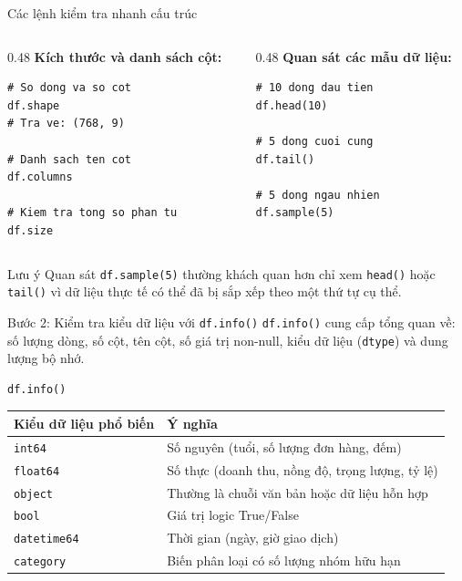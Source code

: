 \documentclass[aspectratio=169,11pt]{beamer}
\newcommand{\code}[1]{\texttt{#1}}
\newcommand{\smallgap}{\vspace{0.35em}}
\begin{document}
\begin{frame}[fragile]{Các lệnh kiểm tra nhanh cấu trúc}
\begin{columns}[T]
\begin{column}{0.48\textwidth}
\textbf{Kích thước và danh sách cột:}
\begin{lstlisting}[style=pythonstyle]
# So dong va so cot
df.shape
# Tra ve: (768, 9)

# Danh sach ten cot
df.columns

# Kiem tra tong so phan tu
df.size
\end{lstlisting}
\end{column}
\begin{column}{0.48\textwidth}
\textbf{Quan sát các mẫu dữ liệu:}
\begin{lstlisting}[style=pythonstyle]
# 10 dong dau tien
df.head(10)

# 5 dong cuoi cung
df.tail()

# 5 dong ngau nhien
df.sample(5)
\end{lstlisting}
\end{column}
\end{columns}

\smallgap
\begin{block}{Lưu ý}
Quan sát \code{df.sample(5)} thường khách quan hơn chỉ xem \code{head()} hoặc \code{tail()} vì dữ liệu thực tế có thể đã bị sắp xếp theo một thứ tự cụ thể.
\end{block}
\end{frame}

\begin{frame}[fragile]{Bước 2: Kiểm tra kiểu dữ liệu với \texttt{df.info()}}
\code{df.info()} cung cấp tổng quan về: số lượng dòng, số cột, tên cột, số giá trị non-null, kiểu dữ liệu (\code{dtype}) và dung lượng bộ nhớ.

\begin{lstlisting}[style=pythonstyle]
df.info()
\end{lstlisting}

\smallgap
\begin{tabularx}{\textwidth}{lX}
\toprule
\textbf{Kiểu dữ liệu phổ biến} & \textbf{Ý nghĩa} \\
\midrule
\code{int64} & Số nguyên (tuổi, số lượng đơn hàng, đếm) \\
\code{float64} & Số thực (doanh thu, nồng độ, trọng lượng, tỷ lệ) \\
\code{object} & Thường là chuỗi văn bản hoặc dữ liệu hỗn hợp \\
\code{bool} & Giá trị logic True/False \\
\code{datetime64} & Thời gian (ngày, giờ giao dịch) \\
\code{category} & Biến phân loại có số lượng nhóm hữu hạn \\
\bottomrule
\end{tabularx}
\end{frame}
\end{document}
